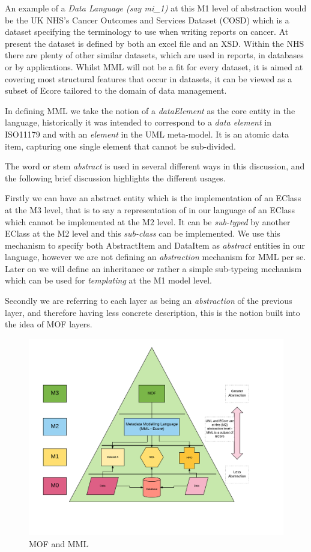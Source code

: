 \documentclass{llncs}
\begin{document}
An example of a \emph{Data Language (say mi\_1)} at this M1 level of abstraction would be the UK NHS's Cancer Outcomes and Services Dataset (COSD) which is a dataset specifying the terminology to use when writing reports on cancer. At present the dataset is defined by both an excel file and an XSD.  Within the NHS there are plenty of other similar datasets, which are used in reports, in databases or by applications.  Whilst MML will not be a fit for every dataset, it is aimed at covering most structural features that occur in datasets, it can be viewed as a subset of Ecore tailored to the domain of data management.

In defining MML we take the notion of a \emph{dataElement} as the core entity in the language, historically it was intended to correspond to a \emph{data element} in ISO11179 and with an \emph{element} in the UML meta-model. It is an atomic data item, capturing one single element that cannot be sub-divided.

The word or stem \emph{abstract} is used in several different ways in this discussion, and the following brief discussion highlights the different usages.  

Firstly we can have an abstract entity which is the implementation of an EClass at the M3 level, that is to say a representation of in our language of an EClass which cannot be implemented at the M2 level. It can be \emph{sub-typed} by another EClass at the M2 level and this \emph{sub-class} can be implemented. We use this mechanism to specify both AbstractItem and DataItem as \emph{abstract} entities in our language, however we are not defining an \emph{abstraction} mechanism for MML per se. Later on we will define an inheritance or rather a simple sub-typeing mechanism which can be used for \emph{templating} at the M1 model level. 

Secondly we are referring to each layer as being an \emph{abstraction} of the previous layer, and therefore having less concrete description, this is the notion built into the idea of MOF layers. 

\begin{figure}
	\centering
	\includegraphics[scale=0.45]{figures/MMLMOFModel}
	\caption{MOF and MML}
	\label{fig:mofmml}
\end{figure}
\end{document}
